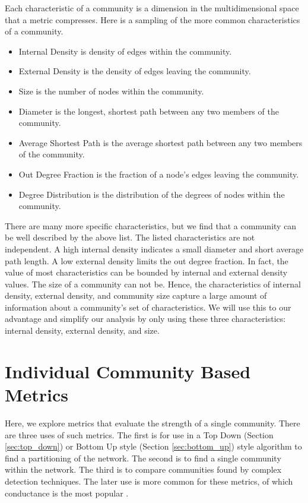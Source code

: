 \documentclass[phd,tocprelim]{cornell}
\begin{document}
Each characteristic of a community is a dimension in the multidimensional space that a metric compresses.  Here is a sampling of the more common characteristics of a community.
\begin{itemize}
\item {\sc Internal Density} is density of edges within the community.
\item {\sc External Density} is the density of edges leaving the community.
\item {\sc Size} is the number of nodes within the community.
\item {\sc Diameter} is the longest, shortest path between any two members of the community.
\item {\sc Average Shortest Path} is the average shortest path between any two members of the community.
\item {\sc Out Degree Fraction} is the fraction of a node's edges leaving the community.
\item {\sc Degree Distribution} is the distribution of the degrees of nodes within the community.
\end{itemize}
There are many more specific characteristics, but we find that a community can be well described by the above list.  The listed characteristics are not independent.  A high internal density indicates a small diameter and short average path length.  A low external density limits the out degree fraction.  In fact, the value of most characteristics can be bounded by internal and external density values.  The size of a community can not be.  Hence, the characteristics of internal density, external density, and community size capture a large amount of information about a community's set of characteristics.  We will use this to our advantage and simplify our analysis by only using these three characteristics: internal density, external density, and size.


\section{Individual Community Based Metrics}

Here, we explore metrics that evaluate the strength of a single community.  There are three uses of such metrics.  The first is for use in a Top Down (Section \ref{sec:top_down}) or Bottom Up style (Section \ref{sec:bottom_up}) style algorithm to find a partitioning of the network.  The second is to find a single community within the network.  The third is to compare communities found by complex detection techniques.  The later use is more common for these metrics, of which conductance is the most popular \cite{JTODO}.
\end{document}
